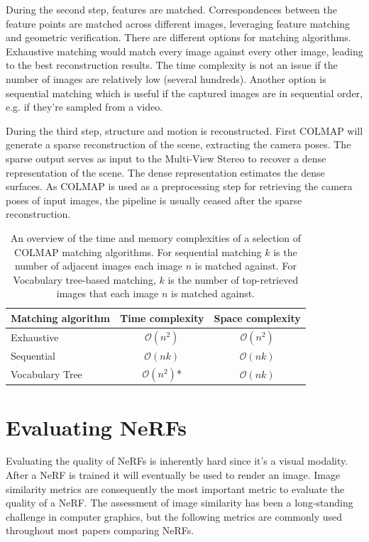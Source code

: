During the second step, features are matched. Correspondences between the feature points are matched across different images, leveraging feature matching and geometric verification. There are different options for matching algorithms. Exhaustive matching would match every image against every other image, leading to the best reconstruction results. The time complexity is not an issue if the number of images are relatively low (several hundreds). Another option is sequential matching which is useful if the captured images are in sequential order, e.g. if they're sampled from a video.

During the third step, structure and motion is reconstructed. First COLMAP will generate a sparse reconstruction of the scene, extracting the camera poses. The sparse output serves as input to the Multi-View Stereo to recover a dense representation of the scene. The dense representation estimates the dense surfaces. As COLMAP is used as a preprocessing step for retrieving the camera poses of input images, the pipeline is usually ceased after the sparse reconstruction.

\begin{table}[h] \label{tab:colmap-complexity}
\begin{tabular}{lcc}
\hline
Matching algorithm & \multicolumn{1}{l}{Time complexity} & \multicolumn{1}{l}{Space complexity} \\ \hline
Exhaustive         & $\mathcal{O}(n^2)$       & $\mathcal{O}(n^2)$  \\
Sequential         & $\mathcal{O}(n k)$ & $\mathcal{O}(n k)$        \\
Vocabulary Tree    & $\mathcal{O}(n^2)$*       & $\mathcal{O}(n k)$  \\ \hline
\end{tabular}
\caption{An overview of the time and memory complexities of a selection of COLMAP matching algorithms. For sequential matching $k$ is the number of adjacent images each image $n$ is matched against. For Vocabulary tree-based matching, $k$ is the number of top-retrieved images that each image $n$ is matched against.}
\end{table}




\section{Evaluating NeRFs}
Evaluating the quality of NeRFs is inherently hard since it's a visual modality. After a NeRF is trained it will eventually be used to render an image. Image similarity metrics are consequently the most important metric to evaluate the quality of a NeRF. The assessment of image similarity has been a long-standing challenge in computer graphics, but the following metrics are commonly used throughout most papers comparing NeRFs.

